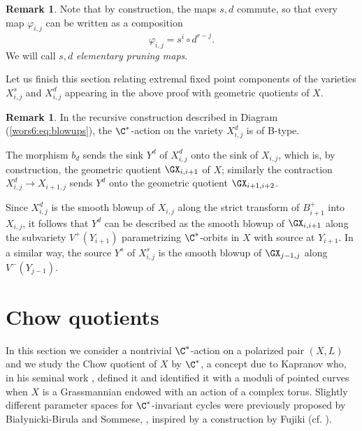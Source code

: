 \documentclass[reqno]{amsproc}
\theoremstyle{definition}
\newtheorem{remark}[theorem]{Remark}
\def\prul{s}
\def\prur{d}
\begin{document}
\begin{remark}\label{wors6:rem:WORS3}
Note that by construction, the maps $\prul,\prur$ commute, so that every map $\varphi_{i,j}$ can be written as a composition $$\varphi_{i,j}=\prul^{i}\circ\prur^{r-j}.$$
We will call $\prul,\prur$ {\em elementary pruning maps}.
\end{remark}

Let us finish this section relating  extremal fixed point components of the varieties $X^s_{i,j}$ and $X^d_{i,j}$  
appearing in the above proof with geometric quotients of $X$.

\begin{remark}\label{wors6:rem:GITblowup}
In the recursive construction described in Diagram (\ref{wors6:eq:blowups}), the $\C^*$-action on the variety $X^\prur_{i,j}$ is of B-type.  

The morphism $b_\prur$ sends the sink $Y^\prur$ of $X^\prur_{i,j}$  onto the sink of $X_{i,j}$, which is, by construction, the geometric quotient $\GX_{i,i+1}$ of $X$; similarly  the contraction $X^\prur_{i,j}\to X_{i+1,j}$ sends $Y^\prur$ onto the geometric quotient $\GX_{i+1,i+2}$. 

Since $X^\prur_{i,j}$ is the smooth blowup of $X_{i,j}$ along the strict transform of $B^+_{i+1}$ into $X_{i,j}$, it follows that $Y^\prur$ can be described as the smooth blowup of $\GX_{i,i+1}$ along the subvariety $V^+(Y_{i+1})$ parametrizing $\C^*$-orbits in $X$ with %
source at $Y_{i+1}$. In a similar way, the source $Y^\prul$ of $X^\prul_{i,j}$ is the smooth blowup of $\GX_{j-1,j}$ along $V^-(Y_{j-1})$.  
\end{remark}


\section{Chow quotients}\label{wors6:sec:Chow}

In this section we consider a nontrivial $\C^*$-action on a polarized pair $(X,L)$ and we  study the Chow quotient of $X$ by $\C^*$, a concept due to Kapranov who, in his seminal work \cite{wors6-Kap}, defined it and identified it with a moduli of pointed curves when $X$ is a Grassmannian endowed with an action of a complex torus. Slightly different parameter spaces for $\C^*$-invariant cycles were previously proposed  by Bia{\l}ynicki-Birula and Sommese, \cite{wors6-BBSo}, inspired by a construction by Fujiki (cf. \cite{wors6-Fj}).
\end{document}
